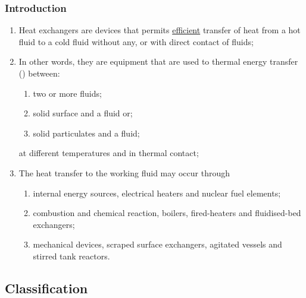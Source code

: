 \documentclass[10pt,compress,unknownkeysallowed]{beamer}
\begin{document}
\begin{frame}
 \frametitle{Introduction}
    \begin{enumerate}%
        \item<1-> Heat exchangers are devices that permits \underline{efficient} transfer of heat from a hot fluid to a cold fluid without any, or with direct contact of fluids;
        \item<2-> In other words, they are equipment that are used to thermal energy transfer (\ie {}) between:
            \begin{enumerate}%
               \item<2-> two or more fluids;
               \item<2-> solid surface and a fluid or;
               \item<2-> solid particulates and a fluid;
            \end{enumerate}
            at different temperatures and in thermal contact;
       \item<3-> The heat transfer to the working fluid may occur through
            \begin{enumerate}%
               \item<3-> internal energy sources, \eg electrical heaters and nuclear fuel elements;
               \item<3-> combustion and chemical reaction, \eg boilers, fired-heaters and fluidised-bed exchangers;
               \item<3-> mechanical devices, \eg scraped surface exchangers, agitated vessels and stirred tank reactors.
            \end{enumerate}
   \end{enumerate}
\end{frame}


\subsection{Classification}
\end{document}
